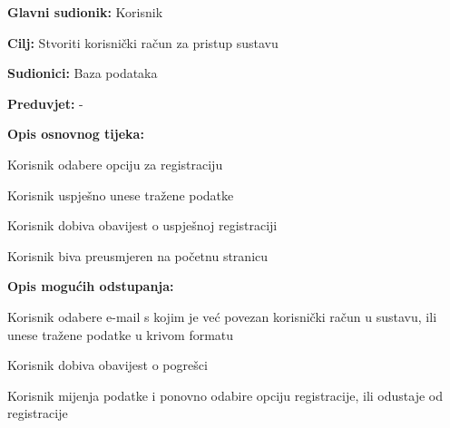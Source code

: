 					\noindent {}
					\begin{packed_item}
	
						\item \textbf{Glavni sudionik: }Korisnik
						\item  \textbf{Cilj:} Stvoriti korisnički račun za pristup sustavu
						\item  \textbf{Sudionici:} Baza podataka
						\item  \textbf{Preduvjet:} -
						\item  \textbf{Opis osnovnog tijeka:}
						
						\item[] \begin{packed_enum}
	
							\item Korisnik odabere opciju za registraciju
							\item Korisnik uspješno unese tražene podatke
							\item Korisnik dobiva obavijest o uspješnoj registraciji
							\item Korisnik biva preusmjeren na početnu stranicu
						\end{packed_enum}
						
						\item  \textbf{Opis mogućih odstupanja:}
						
						\item[] \begin{packed_item}
	
							\item[2.a] Korisnik odabere e-mail s kojim je već povezan korisnički račun u sustavu, ili unese tražene podatke u krivom formatu
							\item[] \begin{packed_enum}
								
								\item Korisnik dobiva obavijest o pogrešci
								\item Korisnik mijenja podatke i ponovno odabire opciju registracije, ili odustaje od registracije
								
							\end{packed_enum}
							
						\end{packed_item}
					\end{packed_item}
					
